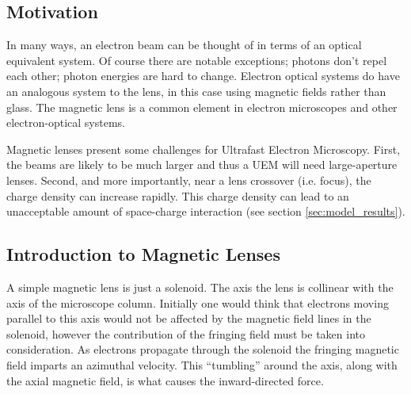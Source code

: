\subsection{Motivation}

In many ways, an electron beam can be thought of in terms of an optical equivalent system. 
Of course there are notable exceptions; photons don't repel each other; photon energies are hard to change.
Electron optical systems do have an analogous system to the lens, in this case using magnetic fields rather than glass. 
The magnetic lens is a common element in electron microscopes and other electron-optical systems.

Magnetic lenses present some challenges for Ultrafast Electron Microscopy.
First, the beams are likely to be much larger and thus a UEM will need large-aperture lenses.
Second, and more importantly, near a lens crossover (i.e. focus), the charge density can increase rapidly.
This charge density can lead to an unacceptable amount of space-charge interaction (see section \ref{sec:model_results}).

\subsection{Introduction to Magnetic Lenses}

A simple magnetic lens is just a solenoid.
The axis the lens is collinear with the axis of the microscope column.
Initially one would think that electrons moving parallel to this axis would not be affected by the magnetic field lines in the solenoid, however the contribution of the fringing field must be taken into consideration.
As electrons propagate through the solenoid the fringing magnetic field imparts an azimuthal velocity.
This ``tumbling'' around the axis, along with the axial magnetic field, is what causes the inward-directed force. 

